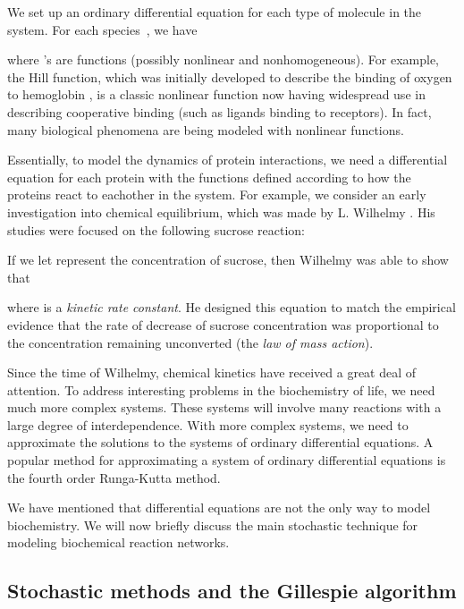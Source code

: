 \documentclass[copyright]{eptcs}
\newcommand{\noi}{\noindent}
\begin{document}
We set up an ordinary differential equation for each type of molecule in the system. 
For each species~, we have



\noi where 's are functions (possibly nonlinear and nonhomogeneous).  For example, the Hill function, which was initially developed to describe the binding of oxygen to hemoglobin \cite{hill10}, is a classic nonlinear function now having widespread use in describing cooperative binding (such as ligands binding to receptors).  In fact, many biological phenomena are being modeled with nonlinear functions.

Essentially, to model the dynamics of protein interactions, we need a differential equation for each protein with the functions defined according to how the proteins react to eachother in the system.  For example, we consider an early investigation into chemical equilibrium, which was made by L. Wilhelmy \cite{mcquarrie67,wilhelmy1850}.  His studies were focused on the following sucrose reaction:



If we let  represent the concentration of sucrose, then Wilhelmy was able to show that


\noi where  is a \emph{kinetic rate constant}.  He designed this equation to match the empirical evidence that the rate of decrease of sucrose concentration was proportional to the concentration remaining unconverted (the \emph{law of mass action}).




Since the time of Wilhelmy, chemical kinetics have received a great deal of attention.  To address interesting problems in the biochemistry of life, we need much more complex systems.  These systems will involve many reactions with a large degree of interdependence.  With more complex systems, we need to approximate the solutions to the systems of ordinary differential equations.  A popular method for approximating a system of ordinary differential equations is the fourth order Runga-Kutta method.  

We have mentioned that differential equations are not the only way to model biochemistry.  We will now briefly discuss the main stochastic technique for modeling biochemical reaction networks.


\subsection{Stochastic methods and the Gillespie algorithm}
\end{document}
